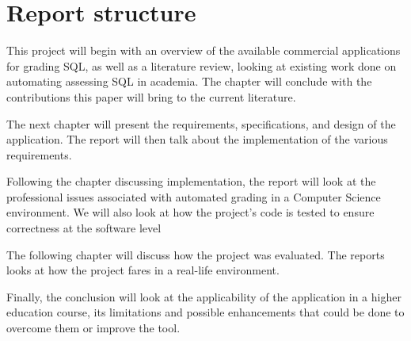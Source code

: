 \section{Report structure}

This project will begin with an overview of the available commercial applications for grading SQL, as well as a literature review, looking at existing work done on automating assessing SQL in academia. The chapter will conclude with the contributions this paper will bring to the current literature.

The next chapter will present the requirements, specifications, and design of the application. The report will then talk about the implementation of the various requirements.

Following the chapter discussing implementation, the report will look at the professional issues associated with automated grading in a Computer Science environment. We will also look at how the project's code is tested to ensure correctness at the software level

The following chapter will discuss how the project was evaluated. The reports looks at how the project fares in a real-life environment.

Finally, the conclusion will look at the applicability of the application in a higher education course, its limitations and possible enhancements that could be done to overcome them or improve the tool.